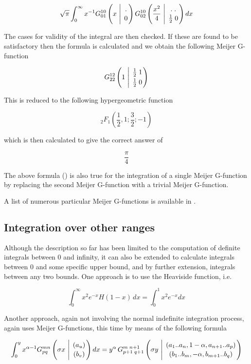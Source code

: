 \[
\sqrt{\pi} \int_{0}^{\infty} x^{-1} G^{1 0}_{0 1} \left(x
\ \Bigg\vert \
\MeijerGparams{.}{0}\right) G^{1 0}_{0 2}\left(\frac{x^{2}}{4}
\ \Bigg\vert \ \MeijerGparams{. \; . }{\frac{1}{2} \; 0} \right) dx
\]

The cases for validity of the integral are then checked. If these
are found to be satisfactory then the formula is calculated and we
obtain the following Meijer G-function

\[
G^{1 2}_{2 2} \left(1 \ \Bigg\vert \ \MeijerGparams{\frac{1}{2} \; 1}{\frac{1}{2} \; 0} \right)
\]

This is reduced to the following hypergeometric function

\[
_2F_1 (\frac{1}{2},1;\frac{3}{2};-1)
\]

which is then calculated to give the correct answer of

\[
\frac{\pi}{4}
\]

The above formula () is also true for the
integration of a single Meijer G-function by replacing the second
Meijer G-function with a trivial Meijer G-function.

A list of numerous particular Meijer G-functions is available in
\cite {Prudnikov:90c}.

\subsection{Integration over other ranges}

Although the description so far has been limited to the computation of
definite integrals between 0 and infinity, it can also be extended to
calculate integrals between 0 and some specific upper bound, and
by further extension, integrals between any two bounds.  One approach is
to use the Heaviside function, i.e.

\[
\int_{0}^{\infty} x^{2} e^{-x} H(1-x)\,dx = \int_{0}^{1} x^{2} e^{-x}dx
\]

Another approach, again not involving the normal indefinite integration
process, again uses Meijer G-functions, this time by means of the
following formula

\begin{equation}
\int_{0}^{y} x^{\alpha-1} G^{m n}_{p q}
\left( \sigma x \  \Bigg\vert \ \MeijerGparams{(a_u)}{(b_v)} \right) dx=%
y^{\alpha}\,G^{m \; n+1}_{p+1 \; q+1} \left( \sigma y \  \Bigg\vert \
\MeijerGparams{( a_1..a_n,1-\alpha,a_{n+1}..a_p)}{(b_1..b_m,-\alpha,b_{m+1}..b_q)} \right) \label{defint:eq2}
\end{equation}

